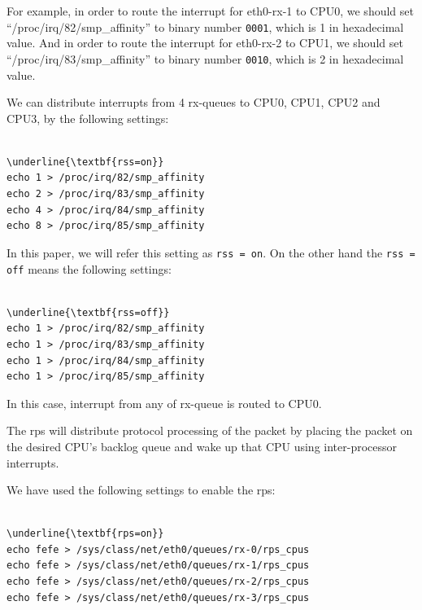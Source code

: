 For example, in order to route the interrupt for eth0-rx-1 to CPU0, 
we should set \enquote{/proc/irq/82/smp\_affinity} 
to binary number {\tt 0001}, which is 1 in hexadecimal value.
And in order to route the interrupt for eth0-rx-2 to CPU1, we 
should set \enquote{/proc/irq/83/smp\_affinity} 
to binary number {\tt 0010}, which is 2 in hexadecimal value.

We can distribute interrupts from 4 rx-queues to CPU0, CPU1, CPU2 and CPU3, by the following settings: 

\begin{center}
\begin{minipage}{0.8\columnwidth}
\begin{Verbatim}[commandchars=\\\{\}]

\underline{\textbf{rss=on}}
echo 1 > /proc/irq/82/smp_affinity
echo 2 > /proc/irq/83/smp_affinity
echo 4 > /proc/irq/84/smp_affinity
echo 8 > /proc/irq/85/smp_affinity

\end{Verbatim}
\end{minipage}
\end{center}

In this paper, we will refer this setting as {\tt rss = on}.
On the other hand the {\tt rss = off} means the following settings:

\begin{center}
\begin{minipage}{0.8\columnwidth}
\begin{Verbatim}[commandchars=\\\{\}]

\underline{\textbf{rss=off}}
echo 1 > /proc/irq/82/smp_affinity
echo 1 > /proc/irq/83/smp_affinity
echo 1 > /proc/irq/84/smp_affinity
echo 1 > /proc/irq/85/smp_affinity

\end{Verbatim}
\end{minipage}
\end{center}

In this case, interrupt from any of rx-queue is routed to CPU0.

The rps will distribute protocol processing of the packet by placing the packet
on the desired CPU's backlog queue and wake up that CPU using inter-processor interrupts.

We have used the following settings to enable the rps:

\begin{center}
\begin{minipage}{0.8\columnwidth}
\begin{Verbatim}[commandchars=\\\{\}]

\underline{\textbf{rps=on}}
echo fefe > /sys/class/net/eth0/queues/rx-0/rps_cpus
echo fefe > /sys/class/net/eth0/queues/rx-1/rps_cpus
echo fefe > /sys/class/net/eth0/queues/rx-2/rps_cpus
echo fefe > /sys/class/net/eth0/queues/rx-3/rps_cpus

\end{Verbatim}
\end{minipage}
\end{center}


